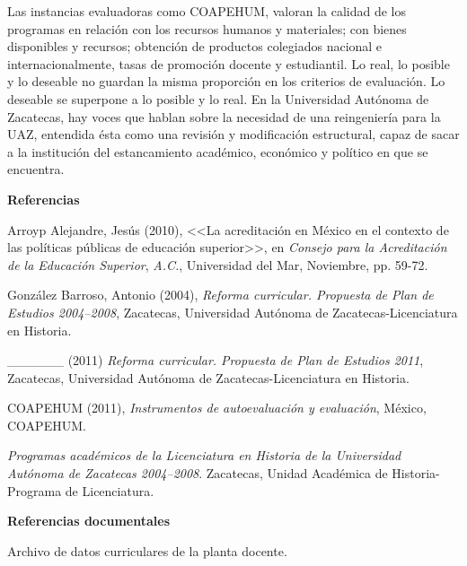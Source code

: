  
Las instancias evaluadoras como COAPEHUM, valoran la calidad de los
programas en relación con los recursos humanos y materiales; con  bienes
disponibles y recursos; obtención de productos colegiados nacional e
internacionalmente, tasas de promoción docente y estudiantil. Lo real, lo
posible y lo deseable no guardan la misma proporción en los criterios de
evaluación. Lo deseable se superpone a lo posible y lo real. En la
Universidad Autónoma de Zacatecas, hay voces que hablan sobre la necesidad
de una reingeniería para la UAZ, entendida ésta como una revisión y
modificación estructural, capaz de sacar a la institución del estancamiento
académico, económico y político en que se encuentra. 


\bigskip
\textbf{Referencias}

 
Arroyp Alejandre, Jesús (2010), <<La acreditación en México en el contexto de
las políticas públicas de educación superior>>, en \textit{Consejo para la
Acreditación de la Educación Superior}, \textit{A.C.}, Universidad del Mar,
Noviembre, pp. 59-72.

 
González Barroso, Antonio (2004), \textit{Reforma curricular. Propuesta de
Plan de Estudios 2004--2008}, Zacatecas, Universidad Autónoma de
Zacatecas-Licenciatura en Historia.

 
\_\_\_\_\_\_ (2011)  \textit{Reforma curricular. Propuesta de
Plan de Estudios 2011}, Zacatecas, Universidad Autónoma de
Zacatecas-Licenciatura en Historia.


COAPEHUM (2011), \textit{Instrumentos de autoevaluación y evaluación}, 
México, COAPEHUM.
 
\textit{Programas académicos de la Licenciatura en Historia de la
Universidad Autónoma de Zacatecas 2004--2008}. Zacatecas, Unidad Académica
de Historia-Programa de Licenciatura.

\medskip
\textbf{Referencias documentales}

Archivo de datos curriculares de la planta docente.